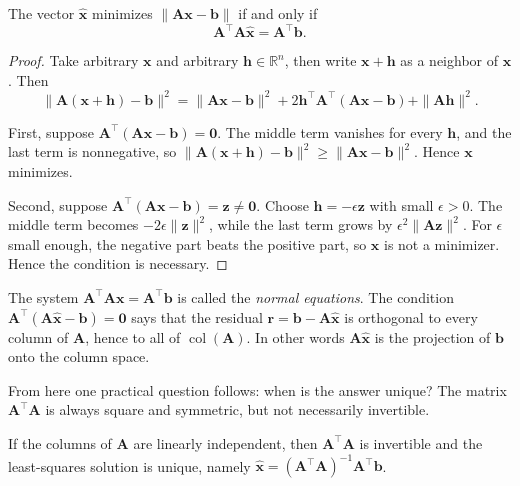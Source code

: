 \begin{teorema}
The vector $\hat{\mathbf{x}}$ minimizes $\|\mathbf{A}\mathbf{x}-\mathbf{b}\|$ if and
only if
\[
  \mathbf{A}^{\top}\mathbf{A}\hat{\mathbf{x}}=\mathbf{A}^{\top}\mathbf{b}.
\]
\end{teorema}

\begin{proof}
Take arbitrary $\mathbf{x}$ and arbitrary $\mathbf{h}\in\mathbb{R}^{n}$, then write
$\mathbf{x}+\mathbf{h}$ as a neighbor of $\mathbf{x}$. Then
\[
  \|\mathbf{A}(\mathbf{x}+\mathbf{h})-\mathbf{b}\|^{2}
  =\|\mathbf{A}\mathbf{x}-\mathbf{b}\|^{2}
   +2\mathbf{h}^{\top}\mathbf{A}^{\top}(\mathbf{A}\mathbf{x}-\mathbf{b})
   +\|\mathbf{A}\mathbf{h}\|^{2}.
\]

First, suppose $\mathbf{A}^{\top}(\mathbf{A}\mathbf{x}-\mathbf{b})=\mathbf{0}$.
The middle term vanishes for every $\mathbf{h}$, and the last term is nonnegative, so
$\|\mathbf{A}(\mathbf{x}+\mathbf{h})-\mathbf{b}\|^{2}\ge\|\mathbf{A}\mathbf{x}-\mathbf{b}\|^{2}$.
Hence $\mathbf{x}$ minimizes.

Second, suppose $\mathbf{A}^{\top}(\mathbf{A}\mathbf{x}-\mathbf{b})=\mathbf{z}\ne\mathbf{0}$.
Choose $\mathbf{h}=-\epsilon\mathbf{z}$ with small $\epsilon>0$. The middle term becomes
$-2\epsilon\|\mathbf{z}\|^{2}$, while the last term grows by
$\epsilon^{2}\|\mathbf{A}\mathbf{z}\|^{2}$. For $\epsilon$ small enough, the negative part
beats the positive part, so $\mathbf{x}$ is not a minimizer. Hence the condition is necessary.
\end{proof}

The system $\mathbf{A}^{\top}\mathbf{A}\mathbf{x}=\mathbf{A}^{\top}\mathbf{b}$ is called the
\emph{normal equations}. The condition
$\mathbf{A}^{\top}(\mathbf{A}\hat{\mathbf{x}}-\mathbf{b})=\mathbf{0}$ says that the residual
$\mathbf{r}=\mathbf{b}-\mathbf{A}\hat{\mathbf{x}}$ is orthogonal to every column of
$\mathbf{A}$, hence to all of $\operatorname{col}(\mathbf{A})$. In other words
$\mathbf{A}\hat{\mathbf{x}}$ is the projection of $\mathbf{b}$ onto the column space.

From here one practical question follows: when is the answer unique? The matrix
$\mathbf{A}^{\top}\mathbf{A}$ is always square and symmetric, but not necessarily
invertible.

\begin{akibat}
If the columns of $\mathbf{A}$ are linearly independent, then $\mathbf{A}^{\top}\mathbf{A}$ is
invertible and the least-squares solution is unique, namely
$\hat{\mathbf{x}}=(\mathbf{A}^{\top}\mathbf{A})^{-1}\mathbf{A}^{\top}\mathbf{b}$.
\end{akibat}

